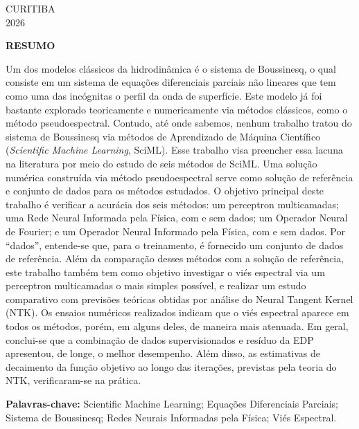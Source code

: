 \vfill
\begin{center}
CURITIBA \\
2026
\end{center}
\pagebreak

\begin{center}
\textbf{RESUMO}
\end{center}
{}
\noindent

Um dos modelos clássicos da hidrodinâmica é o sistema de Boussinesq, o qual consiste em um sistema de equações diferenciais parciais não lineares que tem como uma das incógnitas o perfil da onda de superfície. Este modelo já foi bastante explorado teoricamente e numericamente via métodos clássicos, como o método pseudoespectral. Contudo, até onde sabemos, nenhum trabalho tratou do sistema de Boussinesq via métodos de Aprendizado de Máquina Científico (\textit{Scientific Machine Learning}, SciML). Esse trabalho visa preencher essa lacuna na literatura por meio do estudo de seis métodos de SciML. Uma solução numérica construída via método pseudoespectral serve como solução de referência e conjunto de dados para os métodos estudados. O objetivo principal deste trabalho é verificar a acurácia dos seis métodos: um perceptron multicamadas; uma Rede Neural Informada pela Física, com e sem dados; um Operador Neural de Fourier; e um Operador Neural Informado pela Física, com e sem dados. Por ``dados'', entende-se que, para o treinamento, é fornecido um conjunto de dados de referência. Além da comparação desses métodos com a solução de referência, este trabalho também tem como objetivo investigar o viés espectral via um perceptron multicamadas o mais simples possível, e realizar um estudo comparativo com previsões teóricas obtidas por análise do Neural Tangent Kernel (NTK). Os ensaios numéricos realizados indicam que o viés espectral aparece em todos os métodos, porém, em alguns deles, de maneira mais atenuada. Em geral, conclui-se que a combinação de dados supervisionados e resíduo da EDP apresentou, de longe, o melhor desempenho. Além disso, as estimativas de decaimento da função objetivo ao longo das iterações, previstas pela teoria do NTK, verificaram-se na prática.

\vspace{1cm}
\noindent
\textbf{Palavras-chave:} Scientific Machine Learning; Equações Diferenciais Parciais; Sistema de Boussinesq; Redes Neurais Informadas pela Física; Viés Espectral.

\pagebreak

